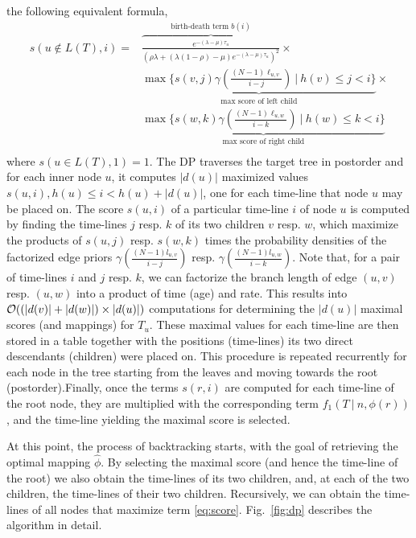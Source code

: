 \documentclass{llncs}
\begin{document}
the following equivalent formula, 
%
%
\begin{equation}\label{eq:DP}
\begin{split}
s(u\notin L(T),i) = & \overbrace{\frac{e^{-(\lambda-\mu)\tau_u}}
                                      {(\rho\lambda + 
                                       (\lambda(1-\rho)-\mu)
                                       e^{-(\lambda-\mu)\tau_u})^2}
                      }^{\textrm{birth-death term } b(i)}\times\\
                    & \underbrace{
                        \max\{ s(v,j)\gamma(\frac{(N-1)\ell_{u,v}}{i-j})\ |\ 
                          h(v) \leq j < i\}
                      }_{\textrm{max score of left child}}\times \\
                    & \underbrace{
                        \max\{ s(w,k)\gamma(\frac{(N-1)\ell_{u,w}}{i-k})\ |\ 
                          h(w) \leq k < i\}
                      }_{\textrm{max score of right child}}\\
\end{split}
\end{equation}
%
%
where $s(u\in L(T),1) = 1$.
%
%
The DP traverses the target tree in postorder and for each inner node $u$, it
computes $|d(u)|$ maximized values $s(u,i), h(u) \leq i < h(u) + |d(u)|$, one
for each time-line that node $u$ may be placed on.  The score $s(u,i)$ of a
particular time-line $i$ of node $u$ is computed by finding the time-lines $j$
resp. $k$ of its two children $v$ resp. $w$, which maximize the products of
$s(u,j)$ resp. $s(w,k)$ times the probability densities of the factorized edge
priors $\gamma(\frac{(N-1)l_{u,v}}{i-j})$ resp.
$\gamma(\frac{(N-1)l_{u,w}}{i-k})$.  Note that, for a pair of time-lines $i$
and $j$ resp. $k$, we can factorize the branch length of edge $(u,v)$ resp.
$(u,w)$ into a product of time (age) and rate.
%
%
This results into ${\cal O}((|d(v)|+|d(w)|)\times|d(u)|)$ computations for
determining the $|d(u)|$ maximal scores (and mappings) for $T_u$. These maximal
values for each time-line are then stored in a table together with the
positions (time-lines) its two direct descendants (children) were placed on.
This procedure is repeated recurrently for each node in the tree starting from
the leaves and moving towards the root (postorder).Finally, once the terms
$s(r,i)$ are computed for each time-line of the root node, they are multiplied
with the corresponding term $f_1(T\ |\ n, \phi(r))$, and the time-line yielding
the maximal score is selected.

At this point, the process of backtracking starts, with the goal of retrieving
the optimal mapping $\hat\phi$. By selecting the maximal score (and hence the
time-line of the root) we also obtain the time-lines of its two children, and,
at each of the two children, the time-lines of their two children. Recursively,
we can obtain the time-lines of all nodes that maximize term \ref{eq:score}.
%
Fig.~\ref{fig:dp} describes the algorithm in detail.
\end{document}
